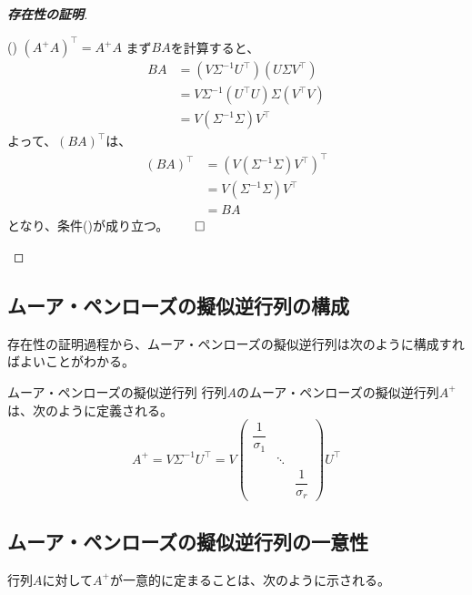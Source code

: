 \documentclass[../../../topic_linear-algebra]{subfiles}
\begin{document}
\begin{proof}[\bfseries 存在性の証明]
    \begin{subpattern}{() $(A^+A)^\top = A^+A$}
      まず$BA$を計算すると、
      \begin{align*}
        BA & = (V \Sigma^{-1} U^\top)(U \Sigma V^\top) \\
           & = V \Sigma^{-1} (U^\top U) \Sigma (V^\top V) \\
           & = V(\Sigma^{-1} \Sigma) V^\top
      \end{align*}
      よって、$(BA)^\top$は、
      \begin{align*}
        (BA)^\top & = (V(\Sigma^{-1} \Sigma) V^\top)^\top \\
                  & = V (\Sigma^{-1} \Sigma) V^\top \\
                  & = BA
      \end{align*}
      となり、条件()が成り立つ。$\qed$
    \end{subpattern}
\end{proof}

\subsection{ムーア・ペンローズの擬似逆行列の構成}

存在性の証明過程から、ムーア・ペンローズの擬似逆行列は次のように構成すればよいことがわかる。

\begin{definition}{ムーア・ペンローズの擬似逆行列}
  行列$A$のムーア・ペンローズの擬似逆行列$A^+$は、次のように定義される。
  \begin{equation*}
    A^+ = V \Sigma^{-1} U^\top = V \begin{pmatrix}
                        \dfrac{1}{\sigma_1} &        &           \\
                                  & \ddots &           \\
                                  &        & \dfrac{1}{\sigma_r}
                      \end{pmatrix} U^\top
  \end{equation*}
\end{definition}

\subsection{ムーア・ペンローズの擬似逆行列の一意性}

行列$A$に対して$A^+$が一意的に定まることは、次のように示される。
\end{document}
